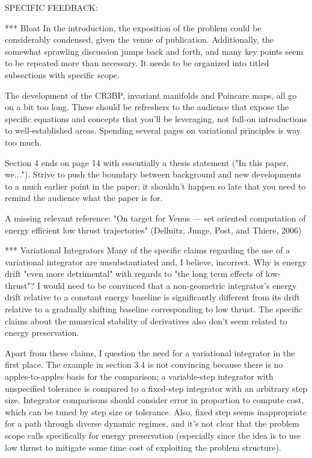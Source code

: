 \documentclass[11pt]{article}
\begin{document}
SPECIFIC FEEDBACK:

*** Bloat
In the introduction, the exposition of the problem could be considerably condensed, given the venue of publication. Additionally, the somewhat sprawling discussion jumps back and forth, and many key points seem to be repeated more than necessary.  It needs to be organized into titled subsections with specific scope.

The development of the CR3BP, invariant manifolds and Poincare maps, all go on a bit too long. These should be refreshers to the audience that expose the specific equations and concepts that you'll be leveraging, not full-on introductions to well-established areas.  Spending several pages on variational principles is way too much.

Section 4 ends on page 14 with essentially a thesis statement ("In this paper, we...").  Strive to push the boundary between background and new developments to a much earlier point in the paper; it shouldn't happen so late that you need to remind the audience what the paper is for.

A missing relevant reference: "On target for Venus — set oriented computation of energy efficient low thrust trajectories" (Dellnitz, Junge, Post, and Thiere, 2006)

*** Variational Integrators
Many of the specific claims regarding the use of a variational integrator are unsubstantiated and, I believe, incorrect. Why is energy drift "even more detrimental" with regards to "the long term effects of low-thrust"?  I would need to be convinced that a non-geometric integrator's energy drift relative to a constant energy baseline is significantly different from its drift relative to a gradually shifting baseline corresponding to low thrust. The specific claims about the numerical stability of derivatives also don't seem related to energy preservation.  

Apart from these claims, I question the need for a variational integrator in the first place. The example in section 3.4 is not convincing because there is no apples-to-apples basis for the comparison; a variable-step integrator with unspecified tolerance is compared to a fixed-step integrator with an arbitrary step size.  Integrator comparisons should consider error in proportion to compute cost, which can be tuned by step size or tolerance.  Also, fixed step seems inappropriate for a path through diverse dynamic regimes, and it's not clear that the problem scope calls specifically for energy preservation (especially since the idea is to use low thrust to mitigate some time cost of exploiting the problem structure).  
\end{document}
